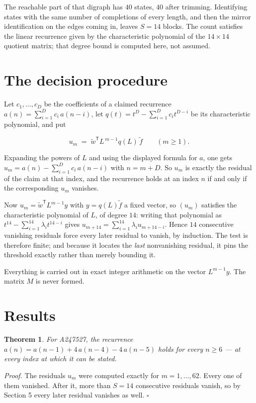 \documentclass[11pt]{article}
\newtheorem{theorem}{Theorem}
\theoremstyle{definition}
\begin{document}
The reachable part of that digraph has $40$ states, $40$ after trimming. Identifying states with the same number of completions of every length, and then the mirror identification on the edges coming in, leaves $S = 14$ blocks. The count satisfies the linear recurrence given by the characteristic polynomial of the $14\times14$ quotient matrix; that degree bound is computed here, not assumed.

\section{The decision procedure}

Let $c_1,\dots,c_D$ be the coefficients of a claimed recurrence $a(n) = \sum_{i=1}^{D} c_i\,a(n-i)$, let $q(t) = t^{D} - \sum_{i=1}^{D} c_i t^{D-i}$ be its characteristic polynomial, and put

\[u_m \;=\; \tilde w^{\mathsf T} L^{\,m-1} q(L)\,\tilde f \qquad (m \ge 1).\]

Expanding the powers of $L$ and using the displayed formula for $a$, one gets $u_m = a(n) - \sum_{i=1}^{D} c_i\,a(n-i)$ with $n = m + D$. So $u_m$ is exactly the residual of the claim at that index, and the recurrence holds at an index $n$ if and only if the corresponding $u_m$ vanishes.

Now $u_m = \tilde w^{\mathsf T} L^{m-1} y$ with $y = q(L)\tilde f$ a fixed vector, so $(u_m)$ satisfies the characteristic polynomial of $L$, of degree $14$: writing that polynomial as $t^{14} - \sum_{i=1}^{14} \lambda_i t^{14-i}$ gives $u_{m+14} = \sum_{i=1}^{14} \lambda_i u_{m+14-i}$. Hence $14$ consecutive vanishing residuals force every later residual to vanish, by induction. The test is therefore finite; and because it locates the {\itshape last} nonvanishing residual, it pins the threshold exactly rather than merely bounding it.

Everything is carried out in exact integer arithmetic on the vector $L^{m-1}y$. The matrix $M$ is never formed.

\section{Results}

\begin{theorem} For A247527, the recurrence $a(n) = a(n-1) + 4\,a(n-4) - 4\,a(n-5)$ holds for every $n \ge 6$ --- at every index at which it can be stated.\end{theorem}

{\itshape Proof.} The residuals $u_m$ were computed exactly for $m = 1,\dots,62$. Every one of them vanished. After it, more than $S = 14$ consecutive residuals vanish, so by Section 5 every later residual vanishes as well. $\square$
\end{document}
